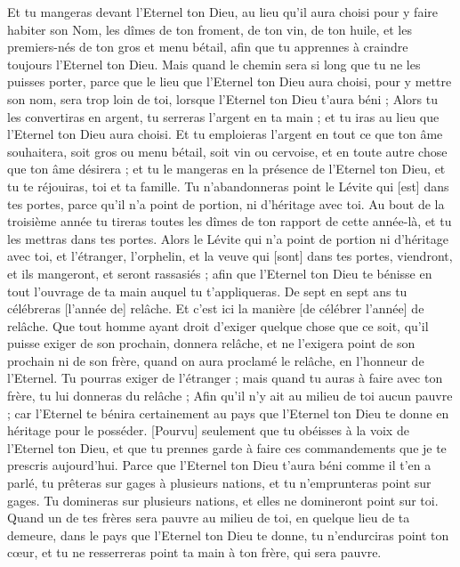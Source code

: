 \begin{multicols}{2}
Et tu mangeras devant l'Eternel ton Dieu, au lieu qu'il aura choisi pour y faire habiter son Nom, les dîmes de ton froment, de ton vin, de ton huile, et les premiers-nés de ton gros et menu bétail, afin que tu apprennes à craindre toujours l'Eternel ton Dieu.
Mais quand le chemin sera si long que tu ne les puisses porter, parce que le lieu que l'Eternel ton Dieu aura choisi, pour y mettre son nom, sera trop loin de toi, lorsque l'Eternel ton Dieu t'aura béni ;
Alors tu les convertiras en argent, tu serreras l'argent en ta main ; et tu iras au lieu que l'Eternel ton Dieu aura choisi.
Et tu emploieras l'argent en tout ce que ton âme souhaitera, soit gros ou menu bétail, soit vin ou cervoise, et en toute autre chose que ton âme désirera ; et tu le mangeras en la présence de l'Eternel ton Dieu, et tu te réjouiras, toi et ta famille.
Tu n'abandonneras point le Lévite qui [est] dans tes portes, parce qu'il n'a point de portion, ni d'héritage avec toi.
Au bout de la troisième année tu tireras toutes les dîmes de ton rapport de cette année-là, et tu les mettras dans tes portes.
Alors le Lévite qui n'a point de portion ni d'héritage avec toi, et l'étranger, l'orphelin, et la veuve qui [sont] dans tes portes, viendront, et ils mangeront, et seront rassasiés ; afin que l'Eternel ton Dieu te bénisse en tout l'ouvrage de ta main auquel tu t'appliqueras.
\VerseOne{}De sept en sept ans tu célébreras [l'année de] relâche.
Et c'est ici la manière [de célébrer l'année] de relâche. Que tout homme ayant droit d'exiger quelque chose que ce soit, qu'il puisse exiger de son prochain, donnera relâche, et ne l'exigera point de son prochain ni de son frère, quand on aura proclamé le relâche, en l'honneur de l'Eternel.
Tu pourras exiger de l'étranger ; mais quand tu auras à faire avec ton frère, tu lui donneras du relâche ;
Afin qu'il n'y ait au milieu de toi aucun pauvre ; car l'Eternel te bénira certainement au pays que l'Eternel ton Dieu te donne en héritage pour le posséder.
[Pourvu] seulement que tu obéisses à la voix de l'Eternel ton Dieu, et que tu prennes garde à faire ces commandements que je te prescris aujourd'hui.
Parce que l'Eternel ton Dieu t'aura béni comme il t'en a parlé, tu prêteras sur gages à plusieurs nations, et tu n'emprunteras point sur gages. Tu domineras sur plusieurs nations, et elles ne domineront point sur toi.
Quand un de tes frères sera pauvre au milieu de toi, en quelque lieu de ta demeure, dans le pays que l'Eternel ton Dieu te donne, tu n'endurciras point ton cœur, et tu ne resserreras point ta main à ton frère, qui sera pauvre.

\end{multicols}
